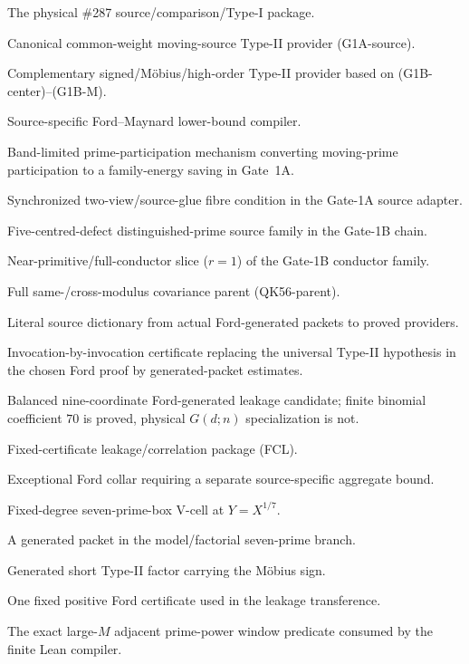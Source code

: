\documentclass[11pt]{article}
\theoremstyle{definition}
\newcommand{\1}{\mathbf 1}
\begin{document}
\begin{description}[leftmargin=3.4cm,style=nextline]
\item[Gate 0] The physical \#287 source/comparison/Type-I package.
\item[Gate 1A] Canonical common-weight moving-source Type-II provider (G1A-source).
\item[Gate 1B] Complementary signed/M\"obius/high-order Type-II provider based on
(G1B-center)--(G1B-M).
\item[Gate 2] Source-specific Ford--Maynard lower-bound compiler.
\item[BPP] Band-limited prime-participation mechanism converting moving-prime participation
to a family-energy saving in Gate~1A.
\item[SB-$\nu$] Synchronized two-view/source-glue fibre condition in the Gate-1A source
adapter.
\item[Pure5] Five-centred-defect distinguished-prime source family in the Gate-1B chain.
\item[NearPrim] Near-primitive/full-conductor slice ($r=1$) of the Gate-1B conductor family.
\item[QK56] Full same-/cross-modulus covariance parent (QK56-parent).
\item[SOURCE-ADAPTER45] Literal source dictionary from actual Ford-generated packets to
proved providers.
\item[$C_{\rm FM}$] Invocation-by-invocation certificate replacing the universal Type-II
hypothesis in the chosen Ford proof by generated-packet estimates.
\item[$R_9$] Balanced nine-coordinate Ford-generated leakage candidate; finite binomial
coefficient $70$ is proved, physical $G(d;n)$ specialization is not.
\item[FCL] Fixed-certificate leakage/correlation package (FCL).
\item[$N_2$] Exceptional Ford collar requiring a separate source-specific aggregate bound.
\item[Balanced7] Fixed-degree seven-prime-box V-cell at $Y=X^{1/7}$.
\item[V-cell] A generated packet in the model/factorial seven-prime branch.
\item[M\"obius singleton] Generated short Type-II factor carrying the M\"obius sign.
\item[fixed-$g_\ast$] One fixed positive Ford certificate used in the leakage transference.
\item[\texttt{WindowPairSupply}] The exact large-$M$ adjacent prime-power window predicate consumed by the finite
Lean compiler.
\end{description}
\end{document}
